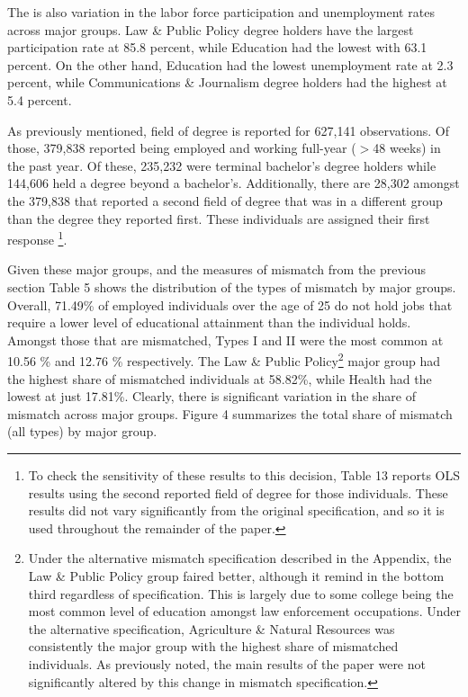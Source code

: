 \documentclass[11pt]{article}
\theoremstyle{definition}
\begin{document}
\vspace{2mm}
The is also variation in the labor force participation and unemployment rates across major groups.   Law \& Public Policy degree holders have the largest participation rate at 85.8 percent, while Education had the lowest with 63.1 percent.  On the other hand, Education had the lowest unemployment rate at 2.3 percent, while Communications \& Journalism degree holders had the highest at 5.4 percent.  

\vspace{2mm}
As previously mentioned, field of degree is reported for 627,141 observations.  Of those, 379,838 reported being employed and working full-year ($>$48 weeks) in the past year.  Of these, 235,232 were terminal bachelor's degree holders while 144,606 held a degree beyond a bachelor's.  Additionally, there are 28,302 amongst the 379,838 that reported a second field of degree that was in a different group than the degree they reported first.  These individuals are assigned their first response \footnote{To check the sensitivity of these results to this decision, Table 13 reports OLS results using the second reported field of degree for those individuals.  These results did not vary significantly from the original specification, and so it is used throughout the remainder of the paper.}.

Given these major groups, and the measures of mismatch from the previous section Table 5 shows the distribution of the types of mismatch by major groups.  Overall, 71.49\% of employed individuals over the age of 25 do not hold jobs that require a lower level of educational attainment than the individual holds.  Amongst those that are mismatched, Types I and II were the most common at 10.56 \% and 12.76 \% respectively.  The Law \& Public Policy\footnote{Under the alternative mismatch specification described in the Appendix, the Law \& Public Policy group faired better, although it remind in the bottom third regardless of specification.  This is largely due to some college being the most common level of education amongst law enforcement occupations.  Under the alternative specification, Agriculture \& Natural Resources was consistently the major group with the highest share of mismatched individuals.  As previously noted, the main results of the paper were not significantly altered by this change in mismatch specification.}  major group had the highest share of mismatched individuals at 58.82\%, while Health had the lowest at just 17.81\%.  Clearly, there is significant variation in the share of mismatch across major groups.  Figure 4 summarizes the total share of mismatch (all types) by major group. 
\end{document}
